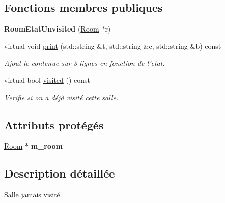\subsection*{Fonctions membres publiques}
\begin{DoxyCompactItemize}
\item 
\hypertarget{class_room_etat_unvisited_a0899593077087a8de79c1cdaedb3833a}{{\bfseries Room\-Etat\-Unvisited} (\hyperlink{class_room}{Room} $\ast$r)}\label{class_room_etat_unvisited_a0899593077087a8de79c1cdaedb3833a}

\item 
virtual void \hyperlink{class_room_etat_unvisited_a75e40c592f3e75f55b4254abfa8bd8ab}{print} (std\-::string \&t, std\-::string \&c, std\-::string \&b) const 
\begin{DoxyCompactList}\small\item\em Ajout le contenue sur 3 lignes en fonction de l'etat. \end{DoxyCompactList}\item 
virtual bool \hyperlink{class_room_etat_unvisited_aece46ff49588ac0e191cc5f7af6860d9}{visited} () const 
\begin{DoxyCompactList}\small\item\em Verifie si on a déjà visité cette salle. \end{DoxyCompactList}\end{DoxyCompactItemize}
\subsection*{Attributs protégés}
\begin{DoxyCompactItemize}
\item 
\hypertarget{class_room_etat_a5b23317f60b9d268bbe669955b3c4725}{\hyperlink{class_room}{Room} $\ast$ {\bfseries m\-\_\-room}}\label{class_room_etat_a5b23317f60b9d268bbe669955b3c4725}

\end{DoxyCompactItemize}


\subsection{Description détaillée}
Salle jamais visité 

